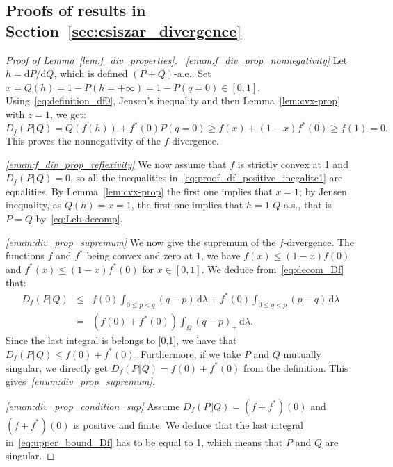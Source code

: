 \documentclass[12pt]{article}
\newcommand{\rd}{\mathrm{d}}
\theoremstyle{plain}
\theoremstyle{remark}
\begin{document}


\subsection{Proofs of results in Section~\ref{sec:csiszar_divergence}}


\begin{proof}[Proof of Lemma~\ref{lem:f_div_properties}]
  \label{p:Df-prop}
 {\it ~\ref{enum:f_div_prop_nonnegativity}} Let $h= \rd P/ \rd Q$, which is defined $(P+Q)$-a.e.. Set $x=
  Q(h)=1- P(h=+\infty )=1- P(q=0)\in [0, 1]$.
Using~\eqref{eq:definition_df0},  Jensen's inequality and then
Lemma~\ref{lem:cvx-prop} with $z=1$, we get:
\begin{equation}
\label{eq:proof_df_positive_inegalite1}
 D_f(P\Vert Q) = Q(f(h))+ f^*(0) P(q=0) \geq   f\left( x \right) + (1-x) f^{*}(0) \geq f(1) = 0.
\end{equation}
This proves the  nonnegativity of
the $f$-divergence.

{\it \ref{enum:f_div_prop_reflexivity}} We now assume that $f$ is strictly convex at 1 and $D_f(P\Vert Q)=0$, so
all the inequalities in~\eqref{eq:proof_df_positive_inegalite1} are
equalities. By Lemma~\ref{lem:cvx-prop} the first one implies that
$x=1$; by Jensen inequality, as $Q(h)=x=1$, the first one implies that $h=1$ $Q$-a.s.,
that is $P=Q$ by~\eqref{eq:Leb-decomp}.


\medskip


{\it \ref{enum:div_prop_supremum}} We     now    give     the    supremum  of the  $f$-divergence.   The functions  $f$  and $f^*$  being
convex   and  zero   at  $1$,   we  have   $f(x)  \leq   (1-x)f(0)$  and
$f^*(x)   \leq    (1-x)f^*(0)$   for   $x   \in    [0,1]$.   We   deduce
from~\eqref{eq:decom_Df} that:
\begin{eqnarray}
\label{eq:upper_bound_Df}
D_f(P\Vert Q) &\leq & f(0) \int_{0\leq  p<q} (q-p) \, \rd \lambda + f^*(0)
\int_{0\leq  q<p}(p-q)  \, \rd \lambda \nonumber \\
&= &(f(0)+f^*(0)) \int_\Omega (q-p)_+ \, \rd \lambda.
\end{eqnarray}
Since the last integral is  belongs to [0,1], we have that $D_f(P \Vert
Q) \leq f(0) + f^*(0)$. Furthermore, if we take $P$ and $Q$ mutually
singular, we directly get  $D_f(P\Vert Q) = f(0) + f^*(0)$ from the definition. This
gives{\it ~\ref{enum:div_prop_supremum}}.


{\it \ref{enum:div_prop_condition_sup}} Assume $D_f(P\Vert Q) = (f + f^*)(0)$ and
$(f+f^*)(0)$ is positive and  finite.  We deduce that the last integral
in~\eqref{eq:upper_bound_Df} has to be equal to 1, which means that $P$ and $Q$
are singular. 


\end{proof}
\end{document}
